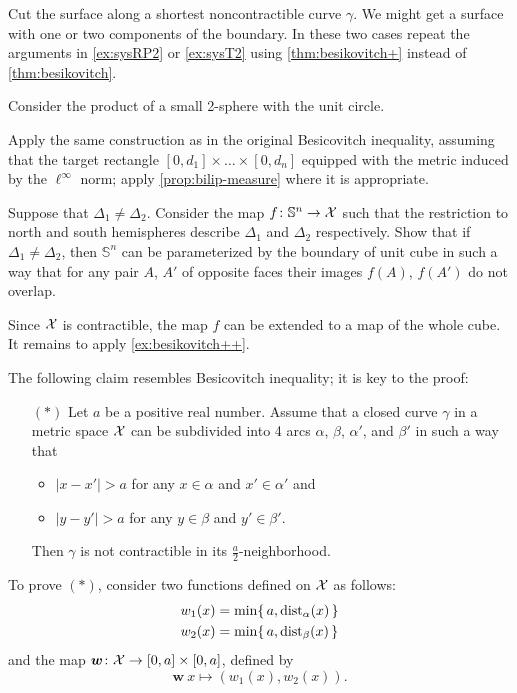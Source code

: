  Cut the surface along a shortest noncontractible curve $\gamma$. 
We might get a surface with one or two components of the boundary.
In these two cases repeat the arguments in \ref{ex:sysRP2} or \ref{ex:sysT2} using \ref{thm:besikovitch+} instead of \ref{thm:besikovitch}.


 Consider the product of a small 2-sphere with the unit circle.

Apply the same construction as in the original Besicovitch inequality, assuming that the target rectangle
$[0,d_1]\times\dots\times [0,d_n]$ equipped with the metric induced by the $\ell^\infty$ norm;
apply \ref{prop:bilip-measure} where it is appropriate.

 Suppose that $\Delta_1\ne\Delta_2$.
Consider the map $f\colon\mathbb{S}^n\to \mathcal{X}$ such that the restriction to north and south hemispheres describe $\Delta_1$ and $\Delta_2$ respectively.
Show that if $\Delta_1\ne\Delta_2$, then $\mathbb{S}^n$ can be parameterized by the boundary of unit cube in such a way that for any pair $A$, $A'$ of opposite faces their images $f(A)$, $f(A')$ do not overlap.

Since $\mathcal{X}$ is contractible, the map $f$ can be extended to a map of the whole cube.
It remains to apply \ref{ex:besikovitch++}.


The following claim resembles Besicovitch inequality;
it is key to the proof:
\begin{itemize}
 \item[$({*})$] Let $a$ be a positive real number.
 Assume that a closed curve $\gamma$ in a metric space $\mathcal{X}$ can be subdivided into 4 arcs $\alpha$, $\beta$, $\alpha'$, and $\beta'$ in such a way that 
 \begin{itemize}
 \item $|x-x'|>a$ for any $x\in\alpha$ and $x'\in \alpha'$
 and
 \item $|y-y'|>a$ for any $y\in\beta$ and $y'\in \beta'$.
 \end{itemize}
 Then $\gamma$ is not contractible in its $\tfrac a2$-neighborhood.
\end{itemize}

To prove $({*})$, consider two functions defined on $\mathcal{X}$ as follows:
\begin{align*}
w_1(x)&=\min \{\,a,\mathrm{dist}_{\alpha}(x)\,\}
\\
w_2(x)&=\min \{\,a,\mathrm{dist}_{\beta}(x)\,\}
\end{align*}
and the map $\bm{w}\colon\mathcal{X}\to [0,a]\times[0,a]$, defined by
\[\bm{w}\:x\mapsto(w_1(x),w_2(x)).\]

